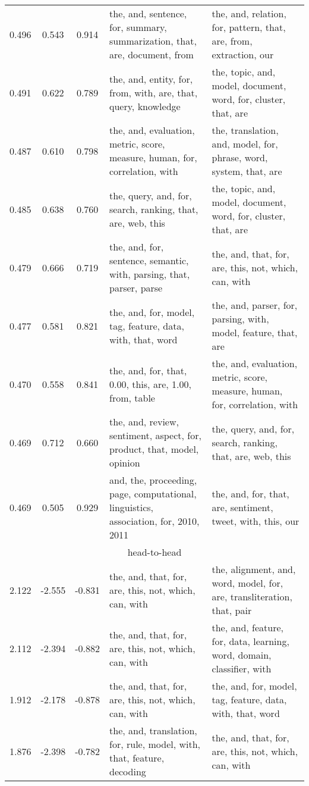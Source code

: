\begin{tabular}{cccp{5cm}p{5cm}}
0.496 & 0.543 & 0.914 & the, and, sentence, for, summary, summarization, that, are, document, from & the, and, relation, for, pattern, that, are, from, extraction, our \\
0.491 & 0.622 & 0.789 & the, and, entity, for, from, with, are, that, query, knowledge & the, topic, and, model, document, word, for, cluster, that, are \\
0.487 & 0.610 & 0.798 & the, and, evaluation, metric, score, measure, human, for, correlation, with & the, translation, and, model, for, phrase, word, system, that, are \\
0.485 & 0.638 & 0.760 & the, query, and, for, search, ranking, that, are, web, this & the, topic, and, model, document, word, for, cluster, that, are \\
0.479 & 0.666 & 0.719 & the, and, for, sentence, semantic, with, parsing, that, parser, parse & the, and, that, for, are, this, not, which, can, with \\
0.477 & 0.581 & 0.821 & the, and, for, model, tag, feature, data, with, that, word & the, and, parser, for, parsing, with, model, feature, that, are \\
0.470 & 0.558 & 0.841 & the, and, for, that, 0.00, this, are, 1.00, from, table & the, and, evaluation, metric, score, measure, human, for, correlation, with \\
0.469 & 0.712 & 0.660 & the, and, review, sentiment, aspect, for, product, that, model, opinion & the, query, and, for, search, ranking, that, are, web, this \\
0.469 & 0.505 & 0.929 & and, the, proceeding, page, computational, linguistics, association, for, 2010, 2011 & the, and, for, that, are, sentiment, tweet, with, this, our \\
\midrule
\multicolumn{5}{c}{head-to-head}\\
2.122 & -2.555 & -0.831 & the, and, that, for, are, this, not, which, can, with & the, alignment, and, word, model, for, are, transliteration, that, pair \\
2.112 & -2.394 & -0.882 & the, and, that, for, are, this, not, which, can, with & the, and, feature, for, data, learning, word, domain, classifier, with \\
1.912 & -2.178 & -0.878 & the, and, that, for, are, this, not, which, can, with & the, and, for, model, tag, feature, data, with, that, word \\
1.876 & -2.398 & -0.782 & the, and, translation, for, rule, model, with, that, feature, decoding & the, and, that, for, are, this, not, which, can, with \\

\end{tabular}
